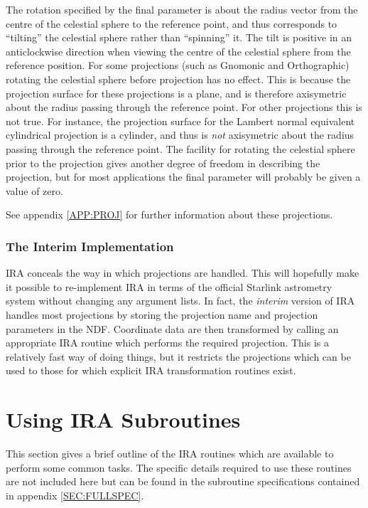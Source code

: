 The rotation specified by the final parameter is about the radius vector from
the centre of the celestial sphere to the reference point, and thus corresponds
to ``tilting'' the celestial sphere rather than ``spinning'' it. The tilt is
positive in an anticlockwise direction when viewing the centre of the celestial
sphere from the reference position. For some projections (such as Gnomonic and
Orthographic) rotating the celestial sphere before projection has no effect.
This is because the projection surface for these projections is a plane, and is
therefore axisymetric about the radius passing through the reference point. For
other projections this is not true. For instance, the projection surface for the
Lambert normal equivalent cylindrical projection is a cylinder, and thus is {\em
not} axisymetric about the radius passing through the reference point. The
facility for rotating the celestial sphere prior to the projection gives another
degree of freedom in describing the projection, but for most applications the
final parameter will probably be given a value of zero.

See appendix \ref {APP:PROJ} for further information about these projections.

\subsubsection {The Interim Implementation}
IRA conceals the way in which projections are handled. This will hopefully make
it possible to re-implement IRA in terms of the official Starlink astrometry
system without changing any argument lists. In fact, the {\em interim} version
of IRA handles most projections by storing the projection name and projection
parameters in the NDF. Coordinate data are then transformed by calling an
appropriate IRA routine which performs the required projection. This is a
relatively fast way of doing things, but it restricts the projections which can
be used to those for which explicit IRA transformation routines exist.

\section {Using IRA Subroutines}
This section gives a brief outline of the IRA routines which are available to
perform some common tasks. The specific details required to use these routines
are not included here but can be found in the subroutine specifications
contained in appendix \ref {SEC:FULLSPEC}.

